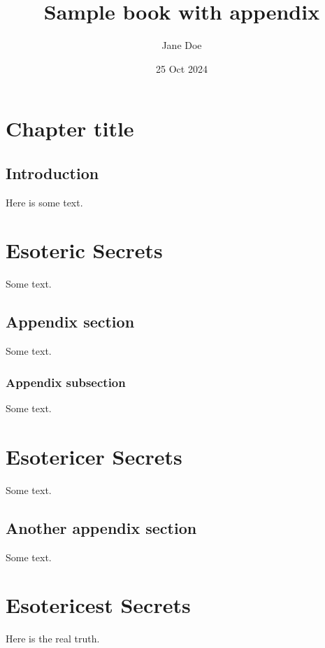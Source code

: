 \documentclass{amsbook}
\title{Sample book with appendix}
\author{Jane Doe}
\date{25 Oct 2024}
\begin{document}
\frontmatter

\tableofcontents

\mainmatter

\chapter{Chapter title}

\section{Introduction}

Here is some text.


\appendix[Appendixes]

\chapter{Esoteric Secrets}

Some text.

\section{Appendix section}

Some text.

\subsection{Appendix subsection}

Some text.

\chapter*{Esotericer Secrets}

Some text.

\section{Another appendix section}

Some text.

\chapter{Esotericest Secrets}

Here is the real truth.

\end{document}
